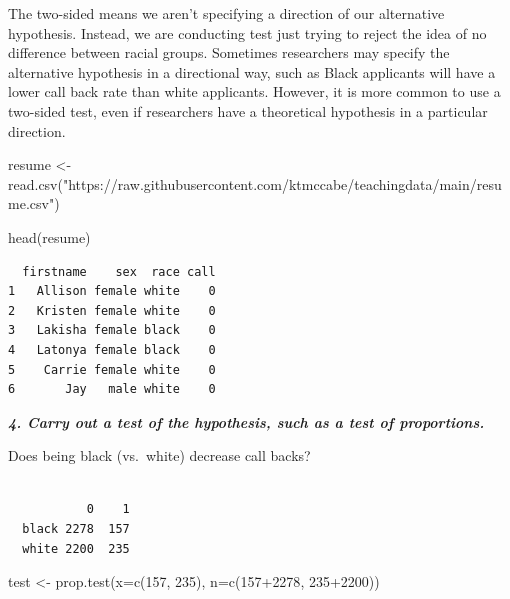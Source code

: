 \documentclass[
  letterpaper,
  DIV=11,
  numbers=noendperiod]{scrreprt}
\newenvironment{Shaded}{\begin{snugshade}}{\end{snugshade}}
\newcommand{\AttributeTok}[1]{\textcolor[rgb]{0.40,0.45,0.13}{#1}}
\newcommand{\DecValTok}[1]{\textcolor[rgb]{0.68,0.00,0.00}{#1}}
\newcommand{\FunctionTok}[1]{\textcolor[rgb]{0.28,0.35,0.67}{#1}}
\newcommand{\NormalTok}[1]{\textcolor[rgb]{0.00,0.23,0.31}{#1}}
\newcommand{\OtherTok}[1]{\textcolor[rgb]{0.00,0.23,0.31}{#1}}
\newcommand{\SpecialCharTok}[1]{\textcolor[rgb]{0.37,0.37,0.37}{#1}}
\newcommand{\StringTok}[1]{\textcolor[rgb]{0.13,0.47,0.30}{#1}}
\begin{document}
The two-sided means we aren't specifying a direction of our alternative
hypothesis. Instead, we are conducting test just trying to reject the
idea of no difference between racial groups. Sometimes researchers may
specify the alternative hypothesis in a directional way, such as Black
applicants will have a lower call back rate than white applicants.
However, it is more common to use a two-sided test, even if researchers
have a theoretical hypothesis in a particular direction.

\begin{Shaded}
\begin{Highlighting}[]
\NormalTok{resume }\OtherTok{\textless{}{-}} \FunctionTok{read.csv}\NormalTok{(}\StringTok{"https://raw.githubusercontent.com/ktmccabe/teachingdata/main/resume.csv"}\NormalTok{)}

\FunctionTok{head}\NormalTok{(resume)}
\end{Highlighting}
\end{Shaded}

\begin{verbatim}
  firstname    sex  race call
1   Allison female white    0
2   Kristen female white    0
3   Lakisha female black    0
4   Latonya female black    0
5    Carrie female white    0
6       Jay   male white    0
\end{verbatim}

\textbf{\emph{4. Carry out a test of the hypothesis, such as a test of
proportions.}}

Does being black (vs.~white) decrease call backs?

\begin{Shaded}
\end{Shaded}

\begin{verbatim}
       
           0    1
  black 2278  157
  white 2200  235
\end{verbatim}

\begin{Shaded}
\begin{Highlighting}[]
\NormalTok{test }\OtherTok{\textless{}{-}} \FunctionTok{prop.test}\NormalTok{(}\AttributeTok{x=}\FunctionTok{c}\NormalTok{(}\DecValTok{157}\NormalTok{, }\DecValTok{235}\NormalTok{), }\AttributeTok{n=}\FunctionTok{c}\NormalTok{(}\DecValTok{157}\SpecialCharTok{+}\DecValTok{2278}\NormalTok{, }\DecValTok{235}\SpecialCharTok{+}\DecValTok{2200}\NormalTok{))}
\end{Highlighting}
\end{Shaded}
\end{document}

